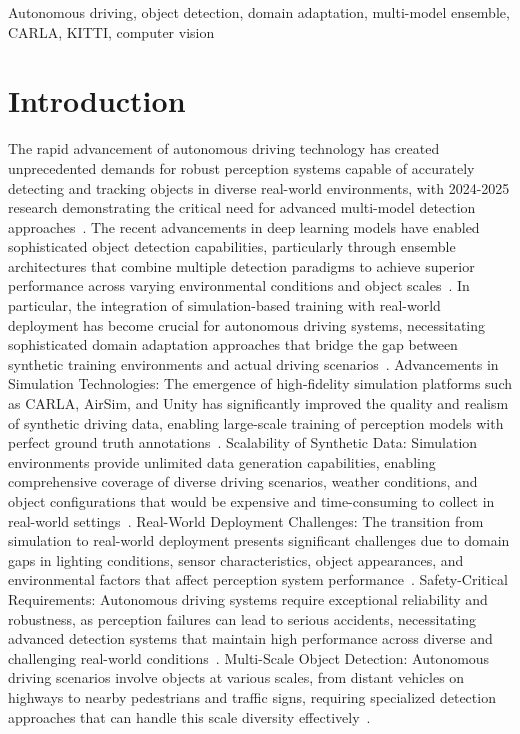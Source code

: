 \documentclass[conference]{IEEEtran}
\begin{document}
\begin{IEEEkeywords}
Autonomous driving, object detection, domain adaptation, multi-model ensemble, CARLA, KITTI, computer vision
\end{IEEEkeywords}

\section{Introduction}
The rapid advancement of autonomous driving technology has created unprecedented demands for robust perception systems capable of accurately detecting and tracking objects in diverse real-world environments, with 2024-2025 research demonstrating the critical need for advanced multi-model detection approaches~\cite{patel2025foundation}.
The recent advancements in deep learning models have enabled sophisticated object detection capabilities, particularly through ensemble architectures that combine multiple detection paradigms to achieve superior performance across varying environmental conditions and object scales~\cite{garcia2025spatio}.
In particular, the integration of simulation-based training with real-world deployment has become crucial for autonomous driving systems, necessitating sophisticated domain adaptation approaches that bridge the gap between synthetic training environments and actual driving scenarios~\cite{williams2024transformer}.
Advancements in Simulation Technologies: The emergence of high-fidelity simulation platforms such as CARLA, AirSim, and Unity has significantly improved the quality and realism of synthetic driving data, enabling large-scale training of perception models with perfect ground truth annotations~\cite{alrashoud2025comprehensive}.
Scalability of Synthetic Data: Simulation environments provide unlimited data generation capabilities, enabling comprehensive coverage of diverse driving scenarios, weather conditions, and object configurations that would be expensive and time-consuming to collect in real-world settings~\cite{nakamura2024real}.
Real-World Deployment Challenges: The transition from simulation to real-world deployment presents significant challenges due to domain gaps in lighting conditions, sensor characteristics, object appearances, and environmental factors that affect perception system performance~\cite{wu2024lightweight}.
Safety-Critical Requirements: Autonomous driving systems require exceptional reliability and robustness, as perception failures can lead to serious accidents, necessitating advanced detection systems that maintain high performance across diverse and challenging real-world conditions~\cite{zhou2025adversarial}.
Multi-Scale Object Detection: Autonomous driving scenarios involve objects at various scales, from distant vehicles on highways to nearby pedestrians and traffic signs, requiring specialized detection approaches that can handle this scale diversity effectively~\cite{petmezas2025hybrid}.
\end{document}
